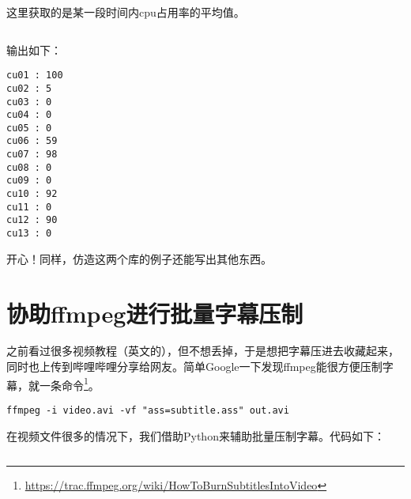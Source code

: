 这里获取的是某一段时间内cpu占用率的平均值。

\inputminted{python}{code/python/get_cpu_info.py}

输出如下：

\begin{verbatim}
cu01 : 100
cu02 : 5
cu03 : 0
cu04 : 0
cu05 : 0
cu06 : 59
cu07 : 98
cu08 : 0
cu09 : 0
cu10 : 92
cu11 : 0
cu12 : 90
cu13 : 0
\end{verbatim}

开心！同样，仿造这两个库的例子还能写出其他东西。

\section{协助ffmpeg进行批量字幕压制}

之前看过很多视频教程（英文的），但不想丢掉，于是想把字幕压进去收藏起来，同时也上传到哔哩哔哩分享给网友。简单Google一下发现ffmpeg能很方便压制字幕，就一条命令\footnote{\url{https://trac.ffmpeg.org/wiki/HowToBurnSubtitlesIntoVideo}}。

\begin{verbatim}
ffmpeg -i video.avi -vf "ass=subtitle.ass" out.avi
\end{verbatim}

在视频文件很多的情况下，我们借助Python来辅助批量压制字幕。代码如下：

\inputminted{python}{code/python/batch_burn.py}
